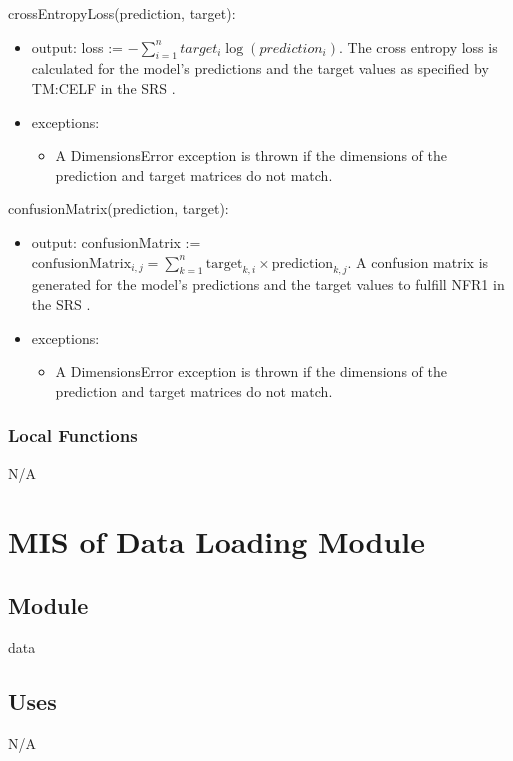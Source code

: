 \documentclass[12pt, titlepage]{article}
\begin{document}
\noindent crossEntropyLoss(prediction, target):
\begin{itemize}
\item output: loss := $- \sum_{i=1}^{n} target_i \log(prediction_i)$. The cross
entropy loss is calculated for the model's predictions and the target values
as specified by TM:CELF in the SRS \cite[4.2.2]{SRS}.
\item exceptions:
\begin{itemize}
  \item A DimensionsError exception is thrown if the dimensions of the prediction
  and target matrices do not match.
\end{itemize}
\end{itemize}

\noindent confusionMatrix(prediction, target):
\begin{itemize}
\item output: confusionMatrix := $\text{confusionMatrix}_{i,j} = \sum_{k=1}^{n} \text{target}_{k,i} \times \text{prediction}_{k,j}$. A confusion matrix is generated for the
model's predictions and the target values to fulfill NFR1 in the SRS
\cite[5.2]{SRS}.
\item exceptions:
\begin{itemize}
  \item A DimensionsError exception is thrown if the dimensions of the prediction
  and target matrices do not match.
\end{itemize}
\end{itemize}

\subsubsection{Local Functions}

N/A

\newpage
\section{MIS of Data Loading Module} \label{MDataLoading}

\subsection{Module}

data
\subsection{Uses}

N/A
\end{document}
